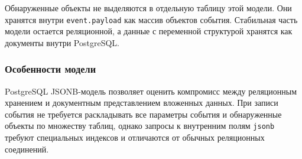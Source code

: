 Обнаруженные объекты не выделяются в отдельную таблицу этой модели. Они
хранятся внутри \texttt{event.payload} как массив объектов события. 
Стабильная часть модели остается реляционной, а данные с переменной 
структурой хранятся как документы внутри PostgreSQL.

\subsubsection{Особенности модели}

PostgreSQL JSONB-модель позволяет оценить компромисс между реляционным
хранением и документным представлением вложенных данных. При записи события
не требуется раскладывать все параметры события и обнаруженные объекты по
множеству таблиц, однако запросы к внутренним полям \texttt{jsonb} требуют
специальных индексов и отличаются от обычных реляционных соединений.

\FloatBarrier
